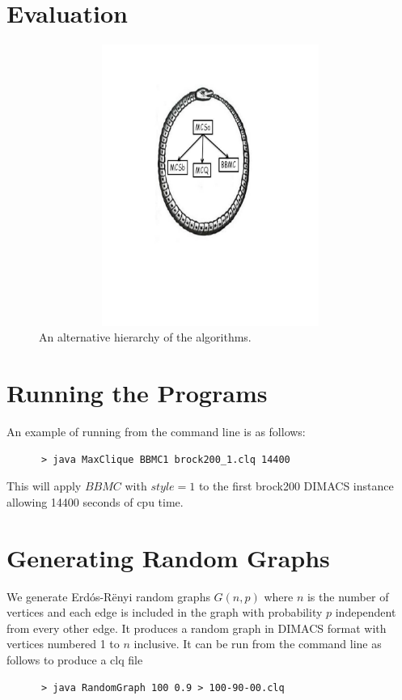 \documentclass{l4proj}
\begin{document}
\chapter{Evaluation}

\begin{figure}
\centering
\includegraphics[height=9.2cm,width=13.2cm]{uroboros.pdf}
\vspace{-30mm}
\caption{An alternative hierarchy of the algorithms.}
\label{uroborus}
\end{figure}



\begin{appendices}

\chapter{Running the Programs}
An example of running from the command line is as follows:
\begin{verbatim}
      > java MaxClique BBMC1 brock200_1.clq 14400
\end{verbatim}
This will apply $BBMC$ with $style = 1$ to the first brock200 DIMACS instance allowing 14400 seconds of cpu time.

\chapter{Generating Random Graphs}
\label{sec:randomGraph}
We generate Erd\'{o}s-R\"{e}nyi random graphs $G(n,p)$ where $n$ is the number of vertices and
each edge is included in the graph with probability $p$ independent from every other edge. It produces
a random graph in DIMACS format with vertices numbered 1 to $n$ inclusive. It can be run from the command line as follows to produce 
a clq file
\begin{verbatim}
      > java RandomGraph 100 0.9 > 100-90-00.clq
\end{verbatim}
\end{appendices}




\end{document}
